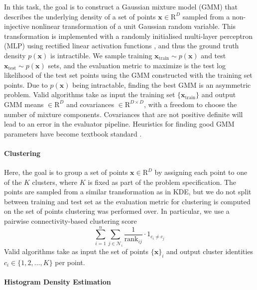 \documentclass[12pt, legalpaper]{article}
\begin{document}
In this task, the goal is to construct a Gaussian mixture model (GMM) that describes the underlying density of a set of points $\mathbf{x} \in \mathrm{R}^D$ sampled from a non-injective nonlinear transformation of a unit Gaussian random variable. 
This transformation is implemented with a randomly initialised multi-layer perceptron (MLP) using rectified linear activation functions \citep{rosenblatt_perceptron_1958}, and thus the ground truth density $p(\mathbf{x})$ is intractible. 
We sample training $\mathbf{x}_{\text{train}} \sim p(\mathbf{x})$ and test $\mathbf{x}_{\text{test}} \sim p(\mathbf{x})$ sets, and the evaluation metric to maximize is the test log likelihood of the test set points using the GMM constructed with the training set points. 
Due to $p(\mathbf{x})$ being intractable, finding the best GMM is an asymmetric problem. 
Valid algorithms take as input the training set $\{ \mathbf{x}_{\text{train}} \}$ and output GMM means $\in \mathrm{R}^D$ and covariances $\in \mathrm{R}^{D \times D}$, with a freedom to choose the number of mixture components. 
Covariances that are not positive definite will lead to an error in the evaluator pipeline. 
Heuristics for finding good GMM parameters have become textbook standard \citep{Silverman1986}. 




\paragraph{Clustering}


Here, the goal is to group a set of points $\mathbf{x} \in \mathrm{R}^D$ by assigning each point to one of the $K$ clusters, where $K$ is fixed as part of the problem specification. 
The points are sampled from a similar transformation as in KDE, but we do not split between training and test set as the evaluation metric for clustering is computed on the set of points clustering was performed over. 
In particular, we use a pairwise connectivity-based clustering score 
%
\begin{equation}
    \sum_{i=1}^{n} \sum_{j \in \mathcal{N}_i} \frac{1}{\text{rank}_{ij}} \cdot \mathrm{1}_{c_i \ne c_j}
\end{equation}
%
Valid algorithms take as input the set of points $\{ \mathbf{x} \}_i$ and output cluster identities $c_i \in \{1, 2, \ldots, K \}$ per point. 


\paragraph{Histogram Density Estimation}
\end{document}
